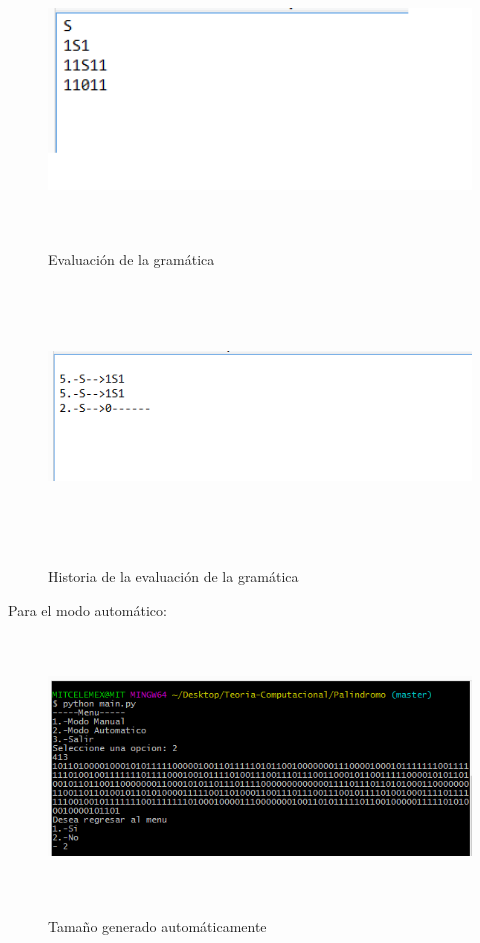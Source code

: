 \begin{figure}[H]
\includegraphics[width=\textwidth, height=7cm]{ArchivoPal.png}
\label{fig:manualtexto_alfabeto}
\caption{Evaluaci\'on de la gram\'atica}
\end{figure}

\begin{figure}[H]
\includegraphics[width=\textwidth, height=7cm]{HistoriaPal.png}
\label{fig:manualtexto_alfabeto}
\caption{Historia de la evaluaci\'on de la gram\'atica}
\end{figure}

Para el modo autom\'atico:\\
\begin{figure}[H]
\includegraphics[width=\textwidth, height=7cm]{ModoAutomaticoPal.png}
\label{fig:auto_alfabeto}
\caption{Tama\~no generado autom\'aticamente}
\end{figure}

